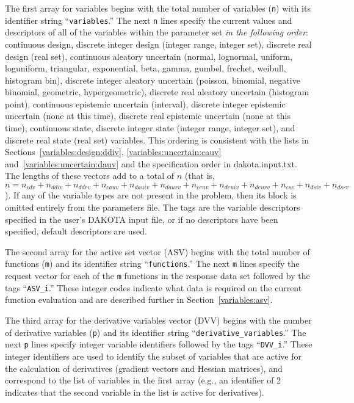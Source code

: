 The first array for variables begins with the total number of
variables (\texttt{n}) with its identifier string
``\texttt{variables}.''  The next \texttt{n} lines specify the current
values and descriptors of all of the variables within the parameter
set \emph{in the following order}: continuous design, discrete integer
design (integer range, integer set), discrete real design (real set),
continuous aleatory uncertain (normal, lognormal, uniform, loguniform,
triangular, exponential, beta, gamma, gumbel, frechet, weibull,
histogram bin), discrete integer aleatory uncertain (poisson,
binomial, negative binomial, geometric, hypergeometric), discrete real
aleatory uncertain (histogram point), continuous epistemic uncertain
(interval), discrete integer epistemic uncertain (none at this time),
discrete real epistemic uncertain (none at this time), continuous
state, discrete integer state (integer range, integer set), and
discrete real state (real set) variables. This ordering is consistent
with the lists in
Sections~\ref{variables:design:ddiv}, \ref{variables:uncertain:cauv}
and~\ref{variables:uncertain:dauv}
and the specification order in dakota.input.txt.  The lengths of these
vectors add to a total of $n$ (that is, $n = n_{cdv} + n_{ddiv} +
n_{ddrv} + n_{cauv} + n_{dauiv} + n_{daurv} + n_{ceuv} + n_{deuiv} +
n_{deurv} + n_{csv} + n_{dsiv} + n_{dsrv}$).  If any of the variable
types are not present in the problem, then its block is omitted
entirely from the parameters file.  The tags are the variable
descriptors specified in the user's DAKOTA input file, or if no
descriptors have been specified, default descriptors are used.

The second array for the active set vector (ASV) begins with the total
number of functions (\texttt{m}) and its identifier string
``\texttt{functions}.'' The next \texttt{m} lines specify the request
vector for each of the \texttt{m} functions in the response data set
followed by the tags ``\texttt{ASV\_i}.''  These integer codes indicate
what data is required on the current function evaluation and are
described further in Section~\ref{variables:asv}.

The third array for the derivative variables vector (DVV) begins with
the number of derivative variables (\texttt{p}) and its identifier
string ``\texttt{derivative\_variables}.'' The next \texttt{p} lines
specify integer variable identifiers followed by the tags
``\texttt{DVV\_i}.''  These integer identifiers are used to identify
the subset of variables that are active for the calculation of
derivatives (gradient vectors and Hessian matrices), and correspond to
the list of variables in the first array (e.g., an identifier of 2
indicates that the second variable in the list is active for
derivatives).

